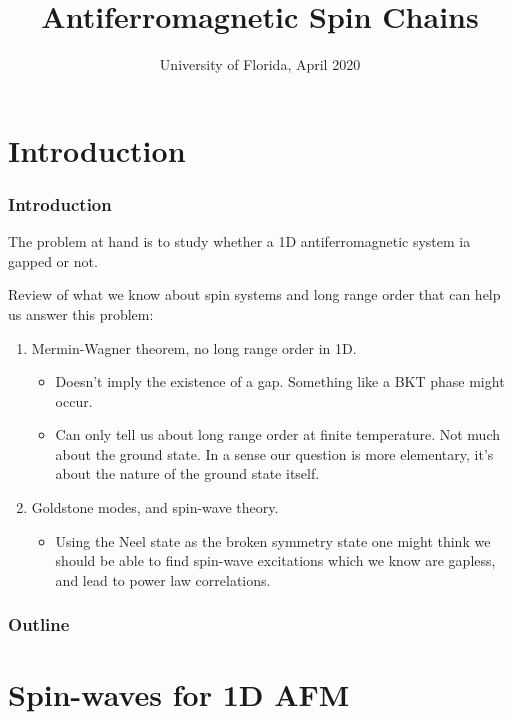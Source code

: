 \documentclass{beamer}
\title{Antiferromagnetic Spin Chains}
\date{University of Florida, April 2020}
\begin{document}

\section*{Introduction}
\begin{frame}
    \frametitle{Introduction}
    The problem at hand is to study whether a 1D antiferromagnetic system ia gapped or not. \pause 

    Review of what we know about spin systems and long range order that can help us answer this problem: \pause
    \begin{enumerate}
        \item Mermin-Wagner theorem, no long range order in 1D. \pause 
        \begin{itemize}
            \item Doesn't imply the existence of a gap. Something like a BKT phase might occur. \pause
            \item  Can only tell us about long range order at finite temperature. Not much about the ground state. In a sense our question is more elementary, it's about the nature of the ground state itself. \pause 
        \end{itemize} 
        \item Goldstone modes, and spin-wave theory. \pause 
        \begin{itemize}
            \item Using the Neel state as the broken symmetry state one might think we should be able to find spin-wave excitations which we know are gapless, and lead to power law correlations.  
        \end{itemize}
    \end{enumerate}
    

\end{frame}

\begin{frame}
    \frametitle{Outline}
    \tableofcontents
\end{frame}




\section{Spin-waves for 1D AFM}
\end{document}
